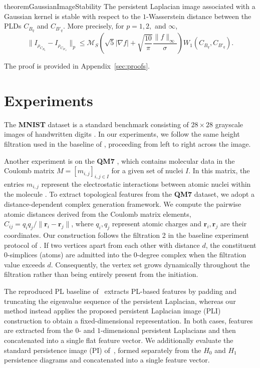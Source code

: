 \documentclass{article}
\begin{document}
\begin{restatable}{theorem}{GaussianImageStability}\label{thm:Gauss}
The persistent Laplacian image associated with a Gaussian kernel is stable with respect to the $1$-Wasserstein distance between the PLDs $C_{B_q}$ and $C_{B'_q}$. More precisely, for $p=1,2,$ and $\infty$,
\[
\|I_{\rho_{C_{B_q}}}-I_{\rho_{C_{B'_q}}}\|_p
\leq \mathcal M_S
\left(\sqrt{5}|\nabla f|+\sqrt{\frac{10}{\pi}}\frac{\|f\|_\infty}{\sigma}\right)
W_1(C_{B_q},C_{B'_q}).
\]
\end{restatable}

The proof is provided in Appendix~\ref{sec:proofs}.

\section{Experiments}
\label{sec:experiments}

The \textbf{MNIST} dataset is a standard benchmark consisting of $28 \times 28$ grayscale images of handwritten digits \cite{lecun2010mnist}. In our experiments, we follow the same height filtration used in the baseline of \cite{davies2023persistent}, proceeding from left to right across the image.

Another experiment is on the \textbf{QM7} \cite{blum, rupp}, which contains molecular data in the Coulomb matrix $M=[m_{i,j}]_{i,j\in I}$ for a given set of nuclei $I$. In this matrix, the entries $m_{i,j}$ represent the electrostatic interactions between atomic nuclei within the molecule \cite{rupp}. To extract topological features from the \textbf{QM7} dataset, we adopt a distance-dependent complex generation framework. We compute the pairwise atomic distances derived from the Coulomb matrix elements, $C_{ij} = q_i q_j / \|\mathbf{r}_i - \mathbf{r}_j\|$, where $q_i, q_j$ represent atomic charges and $\mathbf{r}_i, \mathbf{r}_j$ are their coordinates. Our construction follows the filtration 2 in the baseline experiment protocol of \cite{davies2023persistent}. If two vertices apart from each other with distance $d$, the constituent 0-simplices (atoms) are admitted into the 0-degree complex when the filtration value exceeds $d$. Consequently, the vertex set grows dynamically throughout the filtration rather than being entirely present from the initiation.

The reproduced PL baseline of~\cite{davies2023persistent} extracts PL-based features by padding and truncating the eigenvalue sequence of the persistent Laplacian, whereas our method instead applies the proposed persistent Laplacian image (PLI) construction to obtain a fixed-dimensional representation. In both cases, features are extracted from the $0$- and $1$-dimensional persistent Laplacians and then concatenated into a single flat feature vector. We additionally evaluate the standard persistence image (PI) of~\cite{PI17}, formed separately from the $H_0$ and $H_1$ persistence diagrams and concatenated into a single feature vector.
\end{document}
